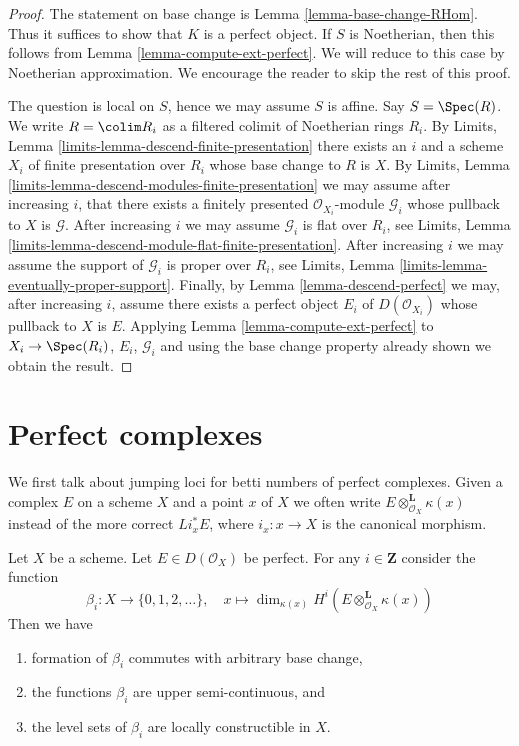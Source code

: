 \begin{proof}
The statement on base change is Lemma \ref{lemma-base-change-RHom}.
Thus it suffices to show that $K$ is a perfect object. If $S$ is
Noetherian, then this follows from
Lemma \ref{lemma-compute-ext-perfect}.
We will reduce to this case by Noetherian approximation.
We encourage the reader to skip the rest of this proof.

\medskip\noindent
The question is local on $S$, hence we may assume $S$ is affine.
Say $S = \Spec(R)$. We write $R = \colim R_i$ as a filtered colimit
of Noetherian rings $R_i$. By Limits, Lemma
\ref{limits-lemma-descend-finite-presentation}
there exists an $i$ and a scheme $X_i$ of finite presentation over $R_i$
whose base change to $R$ is $X$. By
Limits, Lemma \ref{limits-lemma-descend-modules-finite-presentation}
we may assume after increasing $i$, that there exists a finitely
presented $\mathcal{O}_{X_i}$-module $\mathcal{G}_i$ whose
pullback to $X$ is $\mathcal{G}$. After increasing $i$
we may assume $\mathcal{G}_i$ is flat over $R_i$, see
Limits, Lemma \ref{limits-lemma-descend-module-flat-finite-presentation}.
After increasing $i$ we may assume the support of $\mathcal{G}_i$
is proper over $R_i$, see
Limits, Lemma \ref{limits-lemma-eventually-proper-support}.
Finally, by Lemma \ref{lemma-descend-perfect}
we may, after increasing $i$, assume there exists a perfect
object $E_i$ of $D(\mathcal{O}_{X_i})$ whose pullback to
$X$ is $E$. Applying Lemma \ref{lemma-compute-ext-perfect}
to $X_i \to \Spec(R_i)$, $E_i$, $\mathcal{G}_i$ and using the
base change property already shown we obtain the result.
\end{proof}









\section{Perfect complexes}
\label{section-perfect-complexes}

\noindent
We first talk about jumping loci for betti numbers of perfect complexes.
Given a complex $E$ on a scheme $X$ and a point $x$ of $X$ we often write
$E \otimes_{\mathcal{O}_X}^\mathbf{L} \kappa(x)$ instead of the more correct
$Li_x^*E$, where $i_x : x \to X$ is the canonical morphism.

\begin{lemma}
\label{lemma-jump-loci}
Let $X$ be a scheme. Let $E \in D(\mathcal{O}_X)$ be perfect.
For any $i \in \mathbf{Z}$ consider the function
$$
\beta_i : X \longrightarrow \{0, 1, 2, \ldots\},\quad
x \longmapsto
\dim_{\kappa(x)}
H^i(E \otimes_{\mathcal{O}_X}^\mathbf{L} \kappa(x))
$$
Then we have
\begin{enumerate}
\item formation of $\beta_i$ commutes with arbitrary base change,
\item the functions $\beta_i$ are upper semi-continuous, and
\item the level sets of $\beta_i$ are locally constructible in $X$.
\end{enumerate}
\end{lemma}

